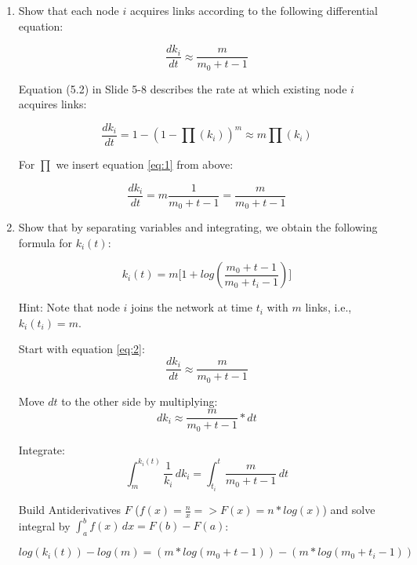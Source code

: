 \begin{enumerate}
	\item Show that each node $i$ acquires links according to the following differential equation:
	
	\begin{equation}  \label{eq:2}
		\frac{dk_i}{dt} \approx \frac{m}{m_0 + t - 1}
	\end{equation}
	
	Equation (5.2) in Slide 5-8 describes the rate at which existing node $i$ acquires links:
	
	\begin{equation}
		\frac{dk_i}{dt} = 1 - (1 - \prod(k_i))^m \approx m \prod(k_i)
	\end{equation}
	
	For $\prod$ we insert equation \ref{eq:1} from above:
	
	\begin{equation}
		\frac{dk_i}{dt} = m \frac{1}{m_0 + t - 1} = \frac{m}{m_0 + t - 1}
	\end{equation}
	
	\item Show that by separating variables and integrating, we obtain the following formula for $k_i(t)$:
	
	\begin{equation}
		k_i(t) = m \biggl[1 + log(\frac{m_0 + t - 1}{m_0 + t_i - 1}) \biggr]
	\end{equation}
	
	Hint: Note that node $i$ joins the network at time $t_i$ with $m$ links, i.e., $k_i(t_i) = m$.
	
	Start with equation \ref{eq:2}:
	\begin{equation*}
		\frac{dk_i}{dt} \approx \frac{m}{m_0 + t - 1}
	\end{equation*}
	
	Move $dt$ to the other side by multiplying:
	\begin{equation*}
		dk_i \approx \frac{m}{m_0 + t - 1} * dt
	\end{equation*}
	
	Integrate:
	\begin{equation*}
		\int_{m}^{k_i(t)} \frac{1}{k_i} \,dk_i = \int_{t_i}^{t} \frac{m}{m_0 + t - 1} \,dt
	\end{equation*}
	
	Build Antiderivatives $F$ ($f(x) = \frac{n}{x} => F(x) = n * log(x)$) and solve integral by $\int_{a}^{b} f(x) \,dx = F(b) - F(a)$:
	
	\begin{equation*}
		log(k_i(t)) - log(m) = (m * log(m_0 + t - 1)) - (m * log(m_0 + t_i - 1))
	\end{equation*}
	

\end{enumerate}
